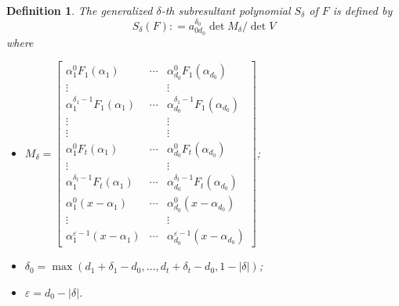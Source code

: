 \documentclass{article}
\newtheorem{definition}[theorem]{Definition}
\begin{document}
\begin{definition}\label{def:S} The generalized $\delta$-th subresultant polynomial $S_{\delta}$ of $F$ is defined by
$${S_\delta }(F): = a_{0d_0}^{\delta_0}\det M_{\delta}/\det V$$
where
\begin{itemize}
\item $M_{\delta}=\left[ {\begin{array}{*{20}{c}}
{\alpha _1^0{F_1}({\alpha _1})}& \cdots &{\alpha _{{d_0}}^0{F_1}({\alpha _{{d_0}}})}\\
 \vdots &  & \vdots \\
{\alpha _1^{{\delta _1} - 1}{F_1}({\alpha _1})}& \cdots &{\alpha _{{d_0}}^{{\delta _1} - 1}{F_1}({\alpha _{{d_0}}})}\\
\hline
 \vdots &{}& \vdots \\
 \vdots &{}& \vdots \\
\hline
{\alpha _1^0{F_t}({\alpha _1})}& \cdots &{\alpha _{{d_0}}^0{F_t}({\alpha _{{d_0}}})}\\
 \vdots &  & \vdots \\
{\alpha _1^{{\delta _t} - 1}{F_t}({\alpha _1})}& \cdots &{\alpha _{{d_0}}^{{\delta _t} - 1}{F_t}({\alpha _{{d_0}}})}\\
\hline
{\alpha _1^0(x - {\alpha _1})}& \cdots &{\alpha _{{d_0}}^0(x - {\alpha _{{d_0}}})}\\
 \vdots &  & \vdots \\
{\alpha _1^{\varepsilon  - 1}(x - {\alpha _1})}& \cdots &{\alpha _{{d_0}}^{\varepsilon  - 1}(x - {\alpha _{{d_0}}})}
\end{array}} \right]$;

  \item $\delta_0=\max(d_1+\delta_1-d_0,\ldots,d_t+\delta_t-d_0,1-|\delta|)$;

  \item $\varepsilon  = {d_0} - |\delta |$.
\end{itemize}
\end{definition}
\end{document}
